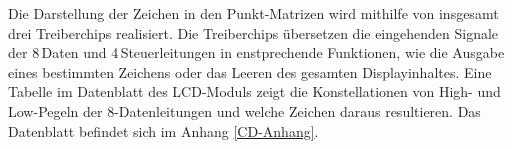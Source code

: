 Die Darstellung der Zeichen in den Punkt-Matrizen wird mithilfe von insgesamt drei Treiberchips realisiert. Die Treiberchips übersetzen die eingehenden Signale der 8\,Daten und  4\,Steuerleitungen in enstprechende Funktionen, wie die Ausgabe eines bestimmten Zeichens oder das Leeren des gesamten Displayinhaltes. Eine Tabelle im Datenblatt des LCD-Moduls zeigt die Konstellationen von High- und Low-Pegeln der 8-Datenleitungen und welche Zeichen daraus resultieren. Das Datenblatt befindet sich im Anhang \ref{CD-Anhang}.
